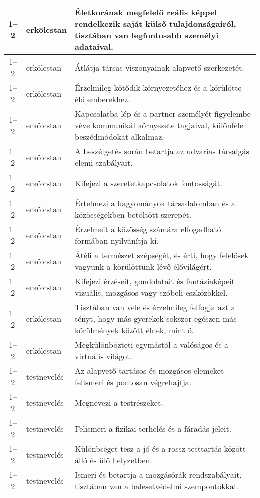 \begin{small}
\begin{longtable}{c | p{2cm} |  p{11cm} }
              1--2 & erkölcstan & Életkorának megfelelő reális képpel rendelkezik saját külső tulajdonságairól, tisztában van legfontosabb személyi adataival. \\ \hline
              1--2 & erkölcstan & Átlátja társas viszonyainak alapvető szerkezetét. \\ \hline
              1--2 & erkölcstan & Érzelmileg kötődik környezetéhez és a körülötte élő emberekhez. \\ \hline
              1--2 & erkölcstan & Kapcsolatba lép és a partner személyét figyelembe véve kommunikál környezete tagjaival, különféle beszédmódokat alkalmaz. \\ \hline
              1--2 & erkölcstan & A beszélgetés során betartja az udvarias társalgás elemi szabályait. \\ \hline
              1--2 & erkölcstan & Kifejezi a szeretetkapcsolatok fontosságát. \\ \hline
              1--2 & erkölcstan & Értelmezi a hagyományok társadalomban és a közösségekben betöltött szerepét. \\ \hline
              1--2 & erkölcstan & Érzelmeit a közösség számára elfogadható formában nyilvánítja ki. \\ \hline
              1--2 & erkölcstan & Átéli a természet szépségét, és érti, hogy felelősek vagyunk a körülöttünk lévő élővilágért. \\ \hline
              1--2 & erkölcstan & Kifejezi érzéseit, gondolatait és fantáziaképeit vizuális, mozgásos vagy szóbeli eszközökkel. \\ \hline
              1--2 & erkölcstan & Tisztában van vele és érzelmileg felfogja azt a tényt, hogy más gyerekek sokszor egészen más körülmények között élnek, mint ő. \\ \hline
              1--2 & erkölcstan & Megkülönbözteti egymástól a valóságos és a virtuális világot. \\ \hline
              1--2 & testnevelés & Az alapvető tartásos és mozgásos elemeket felismeri és pontosan végrehajtja. \\ \hline
              1--2 & testnevelés & Megnevezi a testrészeket. \\ \hline
              1--2 & testnevelés & Felismeri a fizikai terhelés és a fáradás jeleit. \\ \hline
              1--2 & testnevelés & Különbséget tesz a jó és a rossz testtartás között álló és ülő helyzetben. \\ \hline
              1--2 & testnevelés & Ismeri és betartja a mozgásórák rendszabályait, tisztában van a balesetvédelmi szempontokkal. \\ \hline

\end{longtable}
\end{small}
